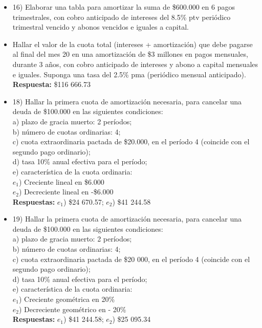 \begin{itemize}
	\item 16)	 Elaborar una tabla para amortizar la suma de \$600.000 en 6 pagos trimestrales, con cobro anticipado de intereses del 8.5\% ptv periódico  trimestral vencido y abonos vencidos e iguales a capital.
	\medskip
	
	\item Hallar el valor de la cuota total (intereses + amortización) que debe pagarse al final del mes 20 en una amortización de \$3 millones en pagos mensuales, durante 3 años, con cobro anticipado de intereses y abono a capital mensuales e iguales. Suponga una tasa del 2.5\% pma (periódico mensual anticipado).\\
	\textbf{Respuesta: }\$116 666.73
	\medskip
	
	\item 18)	 Hallar la primera cuota de amortización necesaria, para cancelar una deuda de \$100.000 en las siguientes condiciones:\\
	
	a) plazo de gracia muerto: 2 períodos; \\
	b) número de cuotas ordinarias: 4; \\
	c) cuota extraordinaria pactada de \$20.000, en el período 4 (coincide con el segundo pago ordinario); \\
	d) tasa 10\% anual efectiva para el período; \\
	e) característica de la cuota ordinaria:\\
	$e_{1}$)  Creciente lineal en \$6.000 \\
	$e_{2}$)  Decreciente lineal en -\$6.000\\
	\textbf{Respuestas:} $e_{1}$)  \$24 670.57;  $e_{2}$)  \$41 244.58
	\medskip
	
	\item 19) Hallar la primera cuota de amortización necesaria, para cancelar una deuda de \$100.000 en las siguientes condiciones:\\
	
	a)	plazo de gracia muerto: 2 períodos; \\
	b)	número de cuotas ordinarias: 4;\\
	c)	cuota extraordinaria pactada de \$20 000, en el período 4 (coincide con el segundo pago ordinario); \\
	d)	tasa 10\% anual efectiva para el período; \\
	e)	característica de la cuota ordinaria:\\
	$e_{1}$)  Creciente geométrica en 20\%\\
	$e_{2}$)  Decreciente geométrico en - 20\%\\
	\textbf{Respuestas: }$e_{1}$)  \$41 244.58;  $e_{2}$)  \$25 095.34\\
	\medskip
	

\end{itemize}
